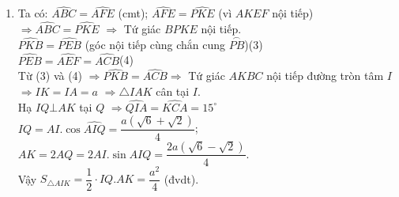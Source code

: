 \begin{ex}
{\begin{enumerate}
\begin{center}
	\end{center}
	\item Ta có: $\widehat{ABC}=\widehat{AFE}$ (cmt); $\widehat{AFE}=\widehat{PKE}$ (vì $AKEF$ nội tiếp)\\
	$\Rightarrow \widehat{ABC}=\widehat{PKE}$ $\Rightarrow$ Tứ giác $BPKE$ nội tiếp.\\
	$\widehat{PKB}=\widehat{PEB}$ (góc nội tiếp cùng chắn cung $\stackrel\frown{PB}$)\quad(3)\\
	$\widehat{PEB}=\widehat{AEF}=\widehat{ACB}$\quad(4)\\
	Từ (3) và (4) $\Rightarrow \widehat{PKB}=\widehat{ACB}\Rightarrow$ Tứ giác $AKBC$ nội tiếp đường tròn tâm $I$\\
	$\Rightarrow IK=IA=a$ $\Rightarrow \triangle IAK$ cân tại $I$.\\
	Hạ $IQ\bot AK$ tại $Q$ $\Rightarrow \widehat{QIA}=\widehat{KCA}=15^{\circ}$\\
	$IQ=AI.\cos\widehat{AIQ}=\dfrac{a(\sqrt{6}+\sqrt{2})}{4}$;\\
	$AK=2AQ=2AI.\sin{AIQ}=\dfrac{2a(\sqrt{6}-\sqrt{2})}{4}$.\\
	Vậy $S_{\triangle AIK}=\dfrac{1}{2}\cdot IQ.AK=\dfrac{a^2}{4}$ (đvdt).
\end{enumerate}}
\end{ex}
